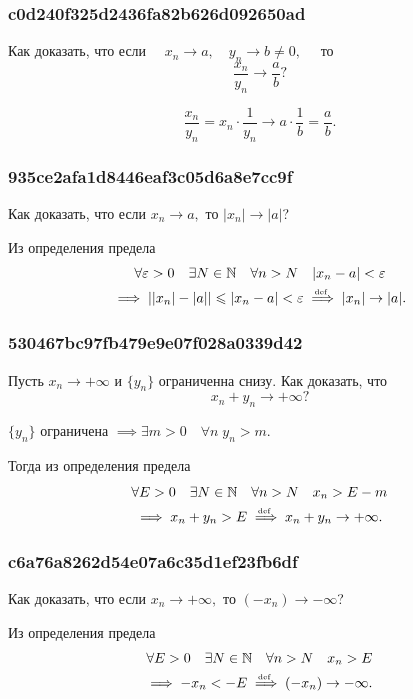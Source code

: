 \documentclass[11pt, a5paper]{article}
\newenvironment{note}[1]{\goodbreak\par\subsubsection{\hfill \color{lightgray}\tiny #1}}{}
\newenvironment{cloze}[2][\ldots]{\begin{leftbar}}{\end{leftbar}}
\begin{document}
    \begin{note}{c0d240f325d2436fa82b626d092650ad}
        Как доказать, что если \( \quad x_n \to a, \quad y_n \to b \neq 0, \quad \) то \[
            \frac{x_n}{y_n} \to \frac{a}{b}?
        \]

        \begin{cloze}{1}
            \[
                \frac{x_n}{y_n} = x_n \cdot \frac{1}{y_n} \to a \cdot \frac{1}{b} = \frac{a}{b}.
            \]
        \end{cloze}
    \end{note}

    \begin{note}{935ce2afa1d8446eaf3c05d6a8e7cc9f}
        Как доказать, что если \( x_n \to a,  \) то \( |x_n| \to |a| \)?

        \begin{cloze}{1}
            Из определения предела
            \begin{multline*}
                \forall \varepsilon > 0 \quad \exists N \in \mathbb N \quad \forall n > N \quad |x_n - a| < \varepsilon \\
                \implies | |x_n| - |a| | \leqslant  |x_n - a| < \varepsilon \overset{\!\!\text{\tiny def}}\implies |x_n| \to |a|.
            \end{multline*}
        \end{cloze}
   \end{note}

   \begin{note}{530467bc97fb479e9e07f028a0339d42}
        Пусть \( x_n \to +\infty \) и \( \{ y_n \} \) ограниченна снизу. Как доказать, что \[ x_n + y_n \to +\infty? \]

        \begin{cloze}{1}
            \( \{ y_n \} \) ограничена \( \implies \exists m > 0 \quad \forall n \; y_n > m. \)

            Тогда из определения предела
            \begin{multline*}
                \forall E > 0 \quad \exists N \in \mathbb N \quad \forall n > N \quad x_n > E - m \\
                \implies x_n + y_n > E \overset{\!\!\text{\tiny def}}\implies x_n + y_n \to +\infty.
            \end{multline*}
        \end{cloze}
   \end{note}

    \begin{note}{c6a76a8262d54e07a6c35d1ef23fb6df}
        Как доказать, что если \( x_n \to +\infty, \) то \( (-x_n) \to -\infty \)?

        \begin{cloze}{1}
            Из определения предела
            \begin{multline*}
                \forall E > 0 \quad \exists N \in \mathbb N \quad \forall n > N \quad x_n > E \\
                \implies -x_n < -E \overset{\!\!\text{\tiny def}}\implies (-x_n) \to -\infty.
            \end{multline*}
        \end{cloze}
    \end{note}
\end{document}
